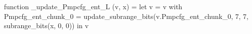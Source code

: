 function _update_Pmpcfg_ent_L (v, x) = let v = { v with Pmpcfg_ent_chunk_0 = update_subrange_bits(v.Pmpcfg_ent_chunk_0, 7, 7, subrange_bits(x, 0, 0)) } in
  v
